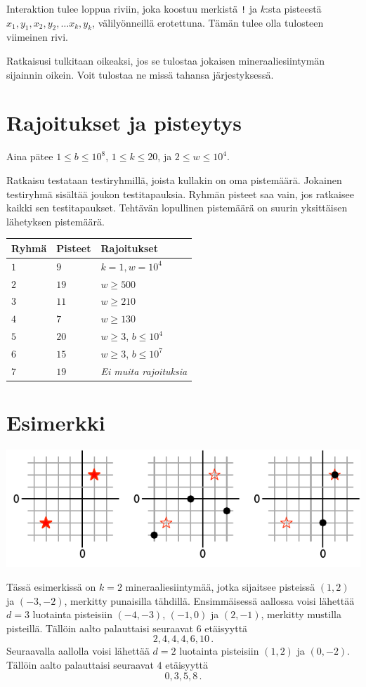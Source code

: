 Interaktion tulee loppua riviin, joka koostuu merkistä \texttt{!} ja $k$:sta pisteestä $x_1, y_1, x_2, y_2, \ldots x_k, y_k$, välilyönneillä erotettuna.
Tämän tulee olla tulosteen viimeinen rivi.

Ratkaisusi tulkitaan oikeaksi, jos se tulostaa jokaisen mineraaliesiintymän sijainnin oikein.
Voit tulostaa ne missä tahansa järjestyksessä.

\section*{Rajoitukset ja pisteytys}

Aina pätee
$1\leq b \leq 10^8$, %
$1 \leq k \leq 20$, %
ja
$2 \le w \le 10^4$. %

Ratkaisu testataan testiryhmillä, joista kullakin on oma pistemäärä.
Jokainen testiryhmä sisältää joukon testitapauksia.
Ryhmän pisteet saa vain, jos ratkaisee kaikki sen testitapaukset.
Tehtävän lopullinen pistemäärä on suurin yksittäisen lähetyksen pistemäärä.

\medskip
\begin{tabular}{lll}
Ryhmä & Pisteet & Rajoitukset \\\hline
  $1$ & $9$ & $k = 1, w = 10^4$\\
  $2$ & $19$ & $w \ge 500$\\
  $3$ & $11$ & $w \ge 210$\\
  $4$ & $7$ & $w \ge 130$\\
  $5$ & $20$ & $w \ge 3$, $b \le 10^4$\\
  $6$ & $15$ & $w \ge 3$, $b \le 10^7$\\
  $7$ & $19$ & \emph{Ei muita rajoituksia}
\end{tabular}

\section*{Esimerkki}

\includegraphics[width=.6\textwidth]{img/sample1.pdf}

Tässä esimerkissä on $k=2$ mineraaliesiintymää, jotka sijaitsee pisteissä $(1,2)$ ja $(-3,-2)$, merkitty punaisilla tähdillä.
Ensimmäisessä aallossa voisi lähettää $d=3$ luotainta pisteisiin $(-4,-3)$, $(-1, 0)$ ja $(2,-1)$, merkitty mustilla pisteillä.
Tällöin aalto palauttaisi seuraavat $6$ etäisyyttä \[
  2, 4, 4, 4, 6, 10\,.
\]
Seuraavalla aallolla voisi lähettää $d=2$ luotainta pisteisiin $(1,2)$ ja $(0,-2)$.
Tällöin aalto palauttaisi seuraavat $4$ etäisyyttä \[
  0, 3, 5, 8\,.
\]
